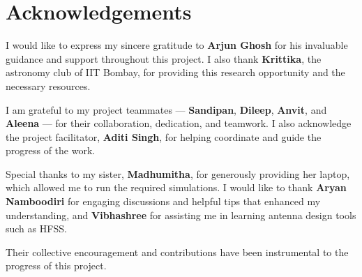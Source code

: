\chapter*{Acknowledgements}

I would like to express my sincere gratitude to \textbf{Arjun Ghosh} for his invaluable guidance and support throughout this project. I also thank \textbf{Krittika}, the astronomy club of IIT Bombay, for providing this research opportunity and the necessary resources.  

I am grateful to my project teammates --- \textbf{Sandipan}, \textbf{Dileep}, \textbf{Anvit}, and \textbf{Aleena} --- for their collaboration, dedication, and teamwork. I also acknowledge the project facilitator, \textbf{Aditi Singh}, for helping coordinate and guide the progress of the work.  

Special thanks to my sister, \textbf{Madhumitha}, for generously providing her laptop, which allowed me to run the required simulations. I would like to thank \textbf{Aryan Namboodiri} for engaging discussions and helpful tips that enhanced my understanding, and \textbf{Vibhashree} for assisting me in learning antenna design tools such as HFSS.  

Their collective encouragement and contributions have been instrumental to the progress of this project.
